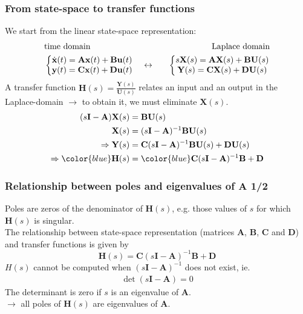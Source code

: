 \begin{frame}
\frametitle{From state-space to transfer functions}
We start from the linear state-space representation:
\begin{align*}
&\text{time domain}\hfill &\text{Laplace domain} \\
&\left\{ \begin{matrix}
\dot{\mathbf{x}}(t) = \mathbf{A} \mathbf{x}(t) + \mathbf{B} \mathbf{u}(t) \\
\mathbf{y}(t) = \mathbf{C} \mathbf{x}(t) + \mathbf{D} \mathbf{u}(t)
\end{matrix} \right. \quad\leftrightarrow\quad
&\left\{ \begin{matrix}
s \mathbf{X}(s) = \mathbf{A} \mathbf{X}(s) + \mathbf{B} \mathbf{U}(s) \\
\mathbf{Y}(s) = \mathbf{C} \mathbf{X}(s) + \mathbf{D} \mathbf{U}(s)
\end{matrix} \right.
\end{align*}
A transfer function $\mathbf{H}(s) = \frac{\mathbf{Y}(s)}{\mathbf{U}(s)}$ relates an input and an output in the Laplace-domain $\rightarrow$ to obtain it, we must eliminate $\mathbf{X}(s)$.
\begin{align*}
(s\mathbf{I}-\mathbf{A}) \mathbf{X}(s) &= \mathbf{B} \mathbf{U}(s) \\
\mathbf{X}(s) &= (s\mathbf{I}-\mathbf{A})^{-1} \mathbf{B} \mathbf{U}(s) \\
\Rightarrow \mathbf{Y}(s) &= \mathbf{C} (s\mathbf{I}-\mathbf{A})^{-1} \mathbf{B} \mathbf{U}(s) + \mathbf{D} \mathbf{U}(s) \\
\Rightarrow \hfill {\color{blue}\mathbf{H}(s)} &= {\color{blue}\mathbf{C} (s\mathbf{I}-\mathbf{A})^{-1} \mathbf{B} + \mathbf{D}}
\end{align*}
\end{frame}

\begin{frame}
\frametitle{Relationship between poles and eigenvalues of $\mathbf{A}$ 1/2}
Poles are zeros of the denominator of $\mathbf{H}(s)$, e.g. those values of $s$ for which $\mathbf{H}(s)$ is singular.\\
The relationship between state-space representation (matrices $\mathbf{A}$, $\mathbf{B}$, $\mathbf{C}$ and $\mathbf{D}$) and transfer functions is given by
\begin{equation*}
\mathbf{H}(s) = \mathbf{C} (s\mathbf{I}-\mathbf{A})^{-1} \mathbf{B} + \mathbf{D}
\end{equation*}
$H(s)$ cannot be computed when $(s\mathbf{I}-\mathbf{A})^{-1}$ does not exist, ie.
\begin{align*}
\det(s\mathbf{I}-\mathbf{A}) = 0
\end{align*}
The determinant is zero if $s$ is an eigenvalue of $\mathbf{A}$.\\ 
$\rightarrow$ {\color{blue}all poles of $\mathbf{H}(s)$ are eigenvalues of $\mathbf{A}$}.
\end{frame}

